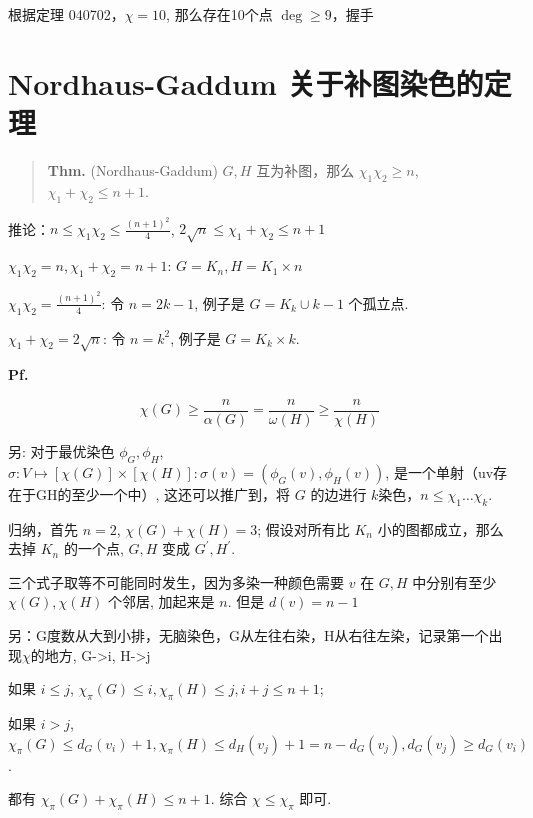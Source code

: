 根据定理 040702，$\chi=10$, 那么存在10个点 $\deg\geq 9$，握手

\section{Nordhaus-Gaddum 关于补图染色的定理}

\begin{quotation}
\textbf{Thm.} (Nordhaus-Gaddum) $G,H$ 互为补图，那么 $\chi_1\chi_2\geq n$, $\chi_1+\chi_2\leq n+1$.
\end{quotation}

推论：$n\leq\chi_1\chi_2\leq\frac{(n+1)^2}{4}$, $2\sqrt{n}\leq\chi_1+\chi_2\leq n+1$

$\chi_1\chi_2=n,\chi_1+\chi_2=n+1$: $G=K_n,H=K_1\times n$

$\chi_1\chi_2=\frac{(n+1)^2}{4}$: 令 $n=2k-1$, 例子是 $G=K_{k}\cup k-1$ 个孤立点.

$\chi_1+\chi_2=2\sqrt{n}$: 令 $n=k^2$, 例子是 $G=K_{k}\times k$.

\textbf{Pf.}

\[
\chi(G)\geq\frac{n}{\alpha(G)}=\frac{n}{\omega(H)}\geq\frac{n}{\chi(H)}
\]

另: 对于最优染色 $\phi_G,\phi_H$, $\sigma:V\mapsto[\chi(G)]\times[\chi(H)]:\sigma(v)=(\phi_G(v),\phi_H(v))$, 是一个单射（uv存在于GH的至少一个中）, 这还可以推广到，将 $G$ 的边进行 $k$染色，$n\leq\chi_1\dots\chi_k$.

归纳，首先 $n=2$, $\chi(G)+\chi(H)=3$; 假设对所有比 $K_n$ 小的图都成立，那么去掉 $K_n$ 的一个点, $G,H$ 变成 $G^\prime,H^\prime$.


三个式子取等不可能同时发生，因为多染一种颜色需要 $v$ 在 $G,H$ 中分别有至少 $\chi(G),\chi(H)$ 个邻居, 加起来是 $n$. 但是 $d(v)=n-1$

另：G度数从大到小排，无脑染色，G从左往右染，H从右往左染，记录第一个出现$\chi$的地方, G->i, H->j


如果 $i\leq j$, $\chi_\pi(G)\leq i, \chi_\pi(H)\leq j, i+j\leq n+1$;

如果 $i>j$, $\chi_\pi(G)\leq d_G(v_i)+1,\chi_\pi(H)\leq d_H(v_j)+1=n-d_G(v_j),d_G(v_j)\geq d_G(v_i)$.

都有 $\chi_\pi(G)+\chi_\pi(H)\leq n+1$. 综合 $\chi\leq\chi_\pi$ 即可.

